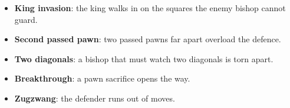 \begin{itemize}
\item \textbf{King invasion}: the king walks in on the squares the enemy bishop cannot guard.

\item \textbf{Second passed pawn}: two passed pawns far apart overload the defence.

\item \textbf{Two diagonals}: a bishop that must watch two diagonals is torn apart.

\item \textbf{Breakthrough}: a pawn sacrifice opens the way.

\item \textbf{Zugzwang}: the defender runs out of moves.
\end{itemize}


